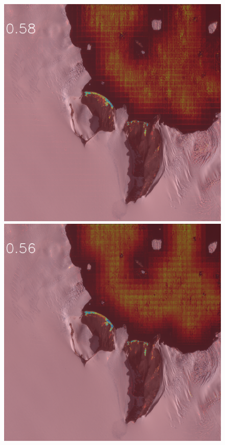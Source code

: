 \begin{figure}[h]
\includegraphics[width=\subFigx]{./fig/datagrow/MSE_single_unet_train_1_1.txt_bias-1_bs128_do0.1e25/1.png}
\includegraphics[width=\subFigx]{./fig/datagrow/MSE_single_unet_train_1_2.txt_bias-1_bs128_do0.1e25/1.png}

\end{figure}
